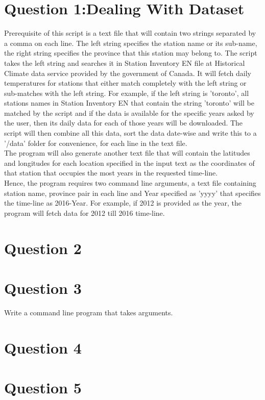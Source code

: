 \documentclass[12pt,letterpaper]{article}
\begin{document}
\section{Question 1:Dealing With Dataset}
Prerequisite of this script is a text file that will contain two strings separated by a comma on each line. The left string specifies the station name or its sub-name, the right string specifies the province that this station may belong to. The script takes the left string and searches it in Station Inventory EN file at Historical Climate data service provided by the government of Canada. It will fetch daily temperatures for stations that either match completely with the left string or sub-matches with the left string. For example, if the left string is 'toronto', all stations names in Station Inventory EN that contain the string 'toronto' will be matched by the script  and if the data is available for the specific years asked by the user, then its daily data for each of those years will be downloaded. The script will then combine all this data, sort the data date-wise and write this to a '/data' folder for convenience, for each line in the text file.\\
The program will also generate another text file that will contain the latitudes and longitudes for each location specified in the input text as the coordinates of that station that occupies the most years in the requested time-line.\\
Hence, the program requires two command line arguments, a text file containing station name, province pair in each line and Year specified as 'yyyy' that specifies the time-line as 2016-Year. For example, if 2012 is provided as the year, the program will fetch data for 2012 till 2016 time-line.

\section{Question 2}
\section{Question 3}
Write a command line program that takes arguments.\\
\section{Question 4}
\section{Question 5}
\end{document}
